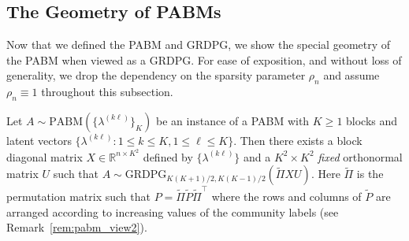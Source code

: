\documentclass[12pt]{article}
\begin{document}
\hypertarget{connecting-the-pabm-to-the-grdpg}{%
\subsection{The Geometry of PABMs}\label{connecting-the-pabm-to-the-grdpg}}
Now that we defined the PABM and GRDPG, 
we show the special geometry of the PABM when viewed as a GRDPG. For
ease of exposition, and without loss of generality, we drop the
dependency on the sparsity parameter $\rho_n$ 
and assume $\rho_n \equiv 1$ throughout this subsection. 
\begin{theorem}
\label{theorem2}
Let $A \sim \mathrm{PABM}(\{\lambda^{(k \ell)}\}_K)$ be an instance of a
PABM with $K \geq 1$ blocks and latent vectors $\{\lambda^{(k \ell)}
\colon 1 \leq k \leq K, 1 \leq \ell \leq K\}$. 
Then there exists a block diagonal matrix
$X \in \mathbb{R}^{n \times K^2}$ defined by $\{\lambda^{(k \ell)}\}$ and a 
$K^2 \times K^2$ {\em fixed} orthonormal matrix $U$ such 
that $A \sim \mathrm{GRDPG}_{K (K+1) / 2, K (K-1) /
  2}(\tilde{\Pi}XU)$. Here $\tilde{\Pi}$ is the permutation matrix
such that $P = \tilde{\Pi} \tilde{P} \tilde{\Pi}^{\top}$ where the
rows and columns of $\tilde{P}$ are arranged according to increasing values of the
community labels (see Remark~\ref{rem:pabm_view2}). 
\end{theorem}
\end{document}
